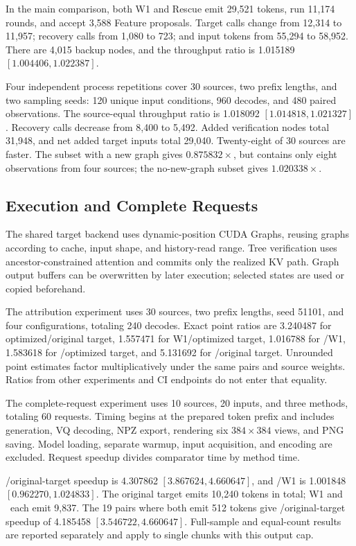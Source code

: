 In the main comparison, both W1 and Rescue emit 29,521 tokens, run 11,174 rounds, and accept 3,588 Feature proposals. Target calls change from 12,314 to 11,957; recovery calls from 1,080 to 723; and input tokens from 55,294 to 58,952. There are 4,015 backup nodes, and the throughput ratio is 1.015189 $[1.004406,1.022387]$.

Four independent process repetitions cover 30 sources, two prefix lengths, and two sampling seeds: 120 unique input conditions, 960 decodes, and 480 paired observations. The source-equal throughput ratio is 1.018092 $[1.014818,1.021327]$. Recovery calls decrease from 8,400 to 5,492. Added verification nodes total 31,948, and net added target inputs total 29,040. Twenty-eight of 30 sources are faster. The subset with a new graph gives $0.875832\times$, but contains only eight observations from four sources; the no-new-graph subset gives $1.020338\times$.

\subsection{Execution and Complete Requests}
\label{app:e2e}
The shared target backend uses dynamic-position CUDA Graphs, reusing graphs according to cache, input shape, and history-read range. Tree verification uses ancestor-constrained attention and commits only the realized KV path. Graph output buffers can be overwritten by later execution; selected states are used or copied beforehand.

The attribution experiment uses 30 sources, two prefix lengths, seed 51101, and four configurations, totaling 240 decodes. Exact point ratios are 3.240487 for optimized/original target, 1.557471 for W1/optimized target, 1.016788 for \PF/W1, 1.583618 for \PF/optimized target, and 5.131692 for \PF/original target. Unrounded point estimates factor multiplicatively under the same pairs and source weights. Ratios from other experiments and CI endpoints do not enter that equality.

The complete-request experiment uses 10 sources, 20 inputs, and three methods, totaling 60 requests. Timing begins at the prepared token prefix and includes generation, VQ decoding, NPZ export, rendering six $384\times384$ views, and PNG saving. Model loading, separate warmup, input acquisition, and encoding are excluded. Request speedup divides comparator time by method time.

\PF/original-target speedup is 4.307862 $[3.867624,4.660647]$, and \PF/W1 is 1.001848 $[0.962270,1.024833]$. The original target emits 10,240 tokens in total; W1 and \PF\ each emit 9,837. The 19 pairs where both emit 512 tokens give \PF/original-target speedup of 4.185458 $[3.546722,4.660647]$. Full-sample and equal-count results are reported separately and apply to single chunks with this output cap.

